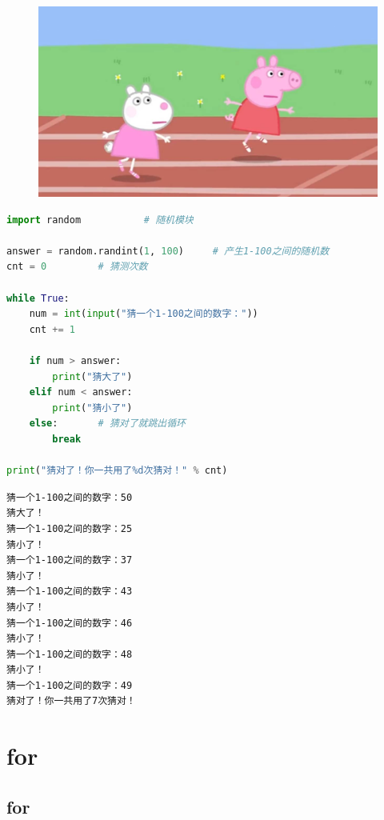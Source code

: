 \begin{figure}[H]
    \centering
    \includegraphics[scale=0.2]{img/C3/3-1/2.png}
\end{figure}


\begin{lstlisting}[language=Python]
import random           # 随机模块

answer = random.randint(1, 100)     # 产生1-100之间的随机数
cnt = 0         # 猜测次数

while True:
    num = int(input("猜一个1-100之间的数字："))
    cnt += 1

    if num > answer:
        print("猜大了")
    elif num < answer:
        print("猜小了")
    else:       # 猜对了就跳出循环
        break

print("猜对了！你一共用了%d次猜对！" % cnt)
\end{lstlisting}

\begin{tcolorbox}
    \begin{verbatim}
猜一个1-100之间的数字：50
猜大了！
猜一个1-100之间的数字：25
猜小了！
猜一个1-100之间的数字：37
猜小了！
猜一个1-100之间的数字：43
猜小了！
猜一个1-100之间的数字：46
猜小了！
猜一个1-100之间的数字：48
猜小了！
猜一个1-100之间的数字：49
猜对了！你一共用了7次猜对！
\end{verbatim}
\end{tcolorbox}

\newpage

\section{for}

\subsection{for}

